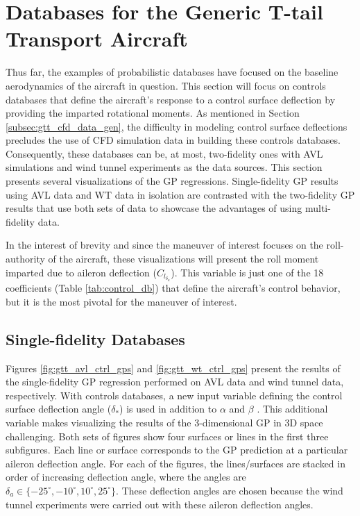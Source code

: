\section{Databases for the Generic T-tail Transport Aircraft} \label{sec:gtt_dbs}

Thus far, the examples of probabilistic databases have focused on the baseline aerodynamics of the aircraft in question. 
This section will focus on controls databases that define the aircraft's response to a control surface deflection by providing the imparted rotational moments. 
As mentioned in Section \ref{subsec:gtt_cfd_data_gen}, the difficulty in modeling control surface deflections precludes the use of CFD simulation data in building these controls databases. 
Consequently, these databases can be, at most, two-fidelity ones with AVL simulations and wind tunnel experiments as the data sources. 
This section presents several visualizations of the GP regressions.
Single-fidelity GP results using AVL data and WT data in isolation are contrasted with the two-fidelity GP results that use both sets of data to showcase the advantages of using multi-fidelity data.

In the interest of brevity and since the maneuver of interest focuses on the roll-authority of the aircraft, these visualizations will present the roll moment imparted due to aileron deflection ($C_{l_{\delta_a}}$).
This variable is just one of the 18 coefficients (Table \ref{tab:control_db}) that define the aircraft's control behavior, but it is the most pivotal for the maneuver of interest. 

\subsection{Single-fidelity Databases}

Figures \ref{fig:gtt_avl_ctrl_gps} and \ref{fig:gtt_wt_ctrl_gps} present the results of the single-fidelity GP regression performed on AVL data and wind tunnel data, respectively. 
With controls databases, a new input variable defining the control surface deflection angle ($\delta_*$) is used in addition to $\alpha$ and $\beta$ .
This additional variable makes visualizing the results of the 3-dimensional GP in 3D space challenging. 
Both sets of figures show four surfaces or lines in the first three subfigures. 
Each line or surface corresponds to the GP prediction at a particular aileron deflection angle.
For each of the figures, the lines/surfaces are stacked in order of increasing deflection angle, where the angles are $\delta_a \in \{-25^\circ, -10^\circ, 10^\circ, 25^\circ\}$. 
These deflection angles are chosen because the wind tunnel experiments were carried out with these aileron deflection angles. 

